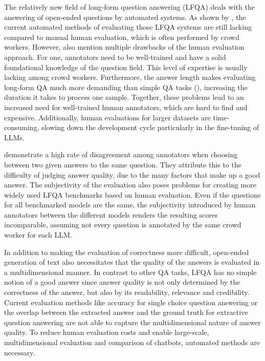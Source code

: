 The relatively new field of long-form question answering (LFQA) deals with the answering of open-ended questions by automated systems.
As shown by \cite{xu:2023:A}, the current automated methods of evaluating those LFQA systems are still lacking compared to manual human evaluation, which is often performed by crowd workers.
However, \cite{xu:2023:A} also mention multiple drawbacks of the human evaluation approach.
For one, annotators need to be well-trained and have a solid foundational knowledge of the question field.
This level of expertise is usually lacking among crowd workers.
Furthermore, the answer length makes evaluating long-form QA much more demanding than simple QA tasks (\cite{krishna:2021:Hurdles}), increasing the duration it takes to process one sample.
Together, these problems lead to an increased need for well-trained human annotators, which are hard to find and expensive.
Additionally, human evaluations for larger datasets are time-consuming, slowing down the development cycle particularly in the fine-tuning of LLMs.

\cite{krishna:2021:Hurdles} demonstrate a high rate of disagreement among annotators when choosing between two given answers to the same question.
They attribute this to the difficulty of judging answer quality, due to the many factors that make up a good answer.
The subjectivity of the evaluation also poses problems for creating more widely used LFQA benchmarks based on human evaluation.
Even if the questions for all benchmarked models are the same, the subjectivity introduced by human annotators between the different models renders the resulting scores incomparable, assuming not every question is annotated by the same crowd worker for each LLM.

In addition to making the evaluation of correctness more difficult, open-ended generation of text also necessitates that the quality of the answers is evaluated in a multidimensional manner.
In contrast to other QA tasks, LFQA has no simple notion of a good answer since answer quality is not only determined by the correctness of the answer, but also by its readability, relevance and credibility.
Current evaluation methods like accuracy for single choice question answering or the overlap between the extracted answer and the ground truth for extractive question answering are not able to capture the multidimensional nature of answer quality.
To reduce human evaluation costs and enable large-scale, multidimensional evaluation and comparison of chatbots, automated methods are necessary.

